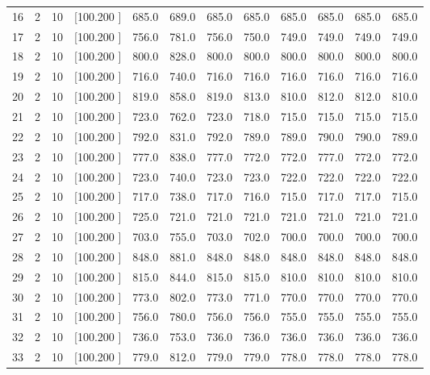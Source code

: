 \documentclass[12pt,a4paper]{article}
\begin{document}
\begin{center}
{\begin{tabular}{r r r r r r r r r r r r}
  16&  2& 10&[100.200   ]&   685.0&   689.0&   685.0&   685.0&   685.0&   685.0&   685.0&   685.0\\[-0.02in]
  17&  2& 10&[100.200   ]&   756.0&   781.0&   756.0&   750.0&   749.0&   749.0&   749.0&   749.0\\[-0.02in]
  18&  2& 10&[100.200   ]&   800.0&   828.0&   800.0&   800.0&   800.0&   800.0&   800.0&   800.0\\[-0.02in]
  19&  2& 10&[100.200   ]&   716.0&   740.0&   716.0&   716.0&   716.0&   716.0&   716.0&   716.0\\[-0.02in]
  20&  2& 10&[100.200   ]&   819.0&   858.0&   819.0&   813.0&   810.0&   812.0&   812.0&   810.0\\[-0.02in]
  21&  2& 10&[100.200   ]&   723.0&   762.0&   723.0&   718.0&   715.0&   715.0&   715.0&   715.0\\[-0.02in]
  22&  2& 10&[100.200   ]&   792.0&   831.0&   792.0&   789.0&   789.0&   790.0&   790.0&   789.0\\[-0.02in]
  23&  2& 10&[100.200   ]&   777.0&   838.0&   777.0&   772.0&   772.0&   777.0&   772.0&   772.0\\[-0.02in]
  24&  2& 10&[100.200   ]&   723.0&   740.0&   723.0&   723.0&   722.0&   722.0&   722.0&   722.0\\[-0.02in]
  25&  2& 10&[100.200   ]&   717.0&   738.0&   717.0&   716.0&   715.0&   717.0&   717.0&   715.0\\[-0.02in]
  26&  2& 10&[100.200   ]&   725.0&   721.0&   721.0&   721.0&   721.0&   721.0&   721.0&   721.0\\[-0.02in]
  27&  2& 10&[100.200   ]&   703.0&   755.0&   703.0&   702.0&   700.0&   700.0&   700.0&   700.0\\[-0.02in]
  28&  2& 10&[100.200   ]&   848.0&   881.0&   848.0&   848.0&   848.0&   848.0&   848.0&   848.0\\[-0.02in]
  29&  2& 10&[100.200   ]&   815.0&   844.0&   815.0&   815.0&   810.0&   810.0&   810.0&   810.0\\[-0.02in]
  30&  2& 10&[100.200   ]&   773.0&   802.0&   773.0&   771.0&   770.0&   770.0&   770.0&   770.0\\[-0.02in]
  31&  2& 10&[100.200   ]&   756.0&   780.0&   756.0&   756.0&   755.0&   755.0&   755.0&   755.0\\[-0.02in]
  32&  2& 10&[100.200   ]&   736.0&   753.0&   736.0&   736.0&   736.0&   736.0&   736.0&   736.0\\[-0.02in]
  33&  2& 10&[100.200   ]&   779.0&   812.0&   779.0&   779.0&   778.0&   778.0&   778.0&   778.0\\[-0.02in]

\end{tabular}}
\end{center}
\end{document}
